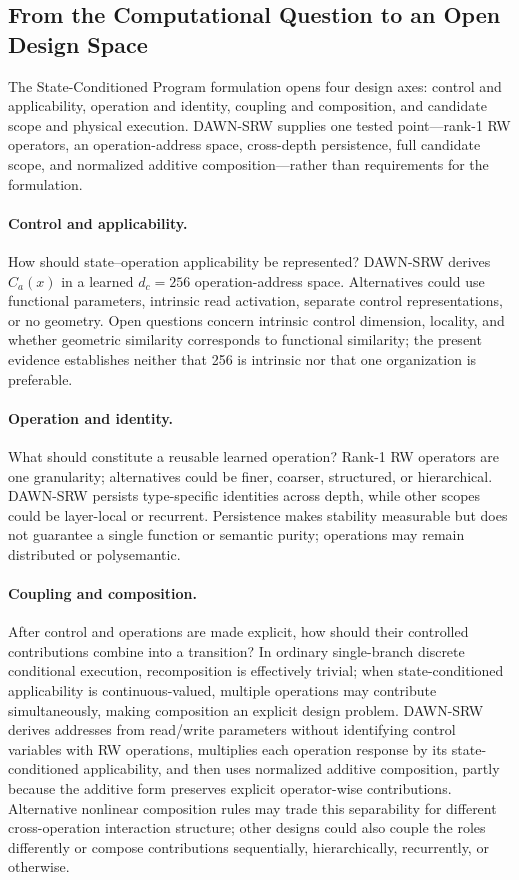 \documentclass{article}
\newcommand{\DAWN}{DAWN-SRW}
\begin{document}
\subsection{From the Computational Question to an Open Design Space}

The State-Conditioned Program formulation opens four design axes: control and
applicability, operation and identity, coupling and composition, and candidate
scope and physical execution. \DAWN{} supplies one tested point---rank-1 RW
operators, an
operation-address space, cross-depth persistence, full candidate scope, and
normalized additive composition---rather than requirements for the formulation.

\paragraph{Control and applicability.}
How should state--operation applicability be represented? \DAWN{} derives
\(C_a(x)\) in a learned \(d_c=256\) operation-address space. Alternatives could
use functional parameters, intrinsic read activation, separate control
representations, or no geometry. Open questions concern intrinsic control
dimension, locality, and whether geometric similarity corresponds to functional
similarity; the present evidence establishes neither that 256 is intrinsic nor
that one organization is preferable.

\paragraph{Operation and identity.}
What should constitute a reusable learned operation? Rank-1 RW operators are
one granularity; alternatives could be finer, coarser, structured, or
hierarchical. \DAWN{} persists type-specific identities across depth, while other
scopes could be layer-local or recurrent. Persistence makes stability measurable
but does not guarantee a single function or semantic purity; operations may
remain distributed or polysemantic.

\newpage
\paragraph{Coupling and composition.}
After control and operations are made explicit, how should their controlled
contributions combine into a transition? In ordinary single-branch discrete
conditional execution, recomposition is effectively trivial; when
state-conditioned applicability is continuous-valued, multiple operations may contribute
simultaneously, making composition an explicit design problem. \DAWN{} derives addresses from
read/write parameters without identifying control variables with RW operations,
multiplies each operation response by its state-conditioned applicability, and
then uses normalized additive composition, partly because the additive form
preserves explicit operator-wise contributions. Alternative nonlinear
composition rules may trade this separability for different cross-operation
interaction structure; other designs could also couple the roles differently or
compose contributions sequentially, hierarchically, recurrently, or otherwise.
\end{document}
